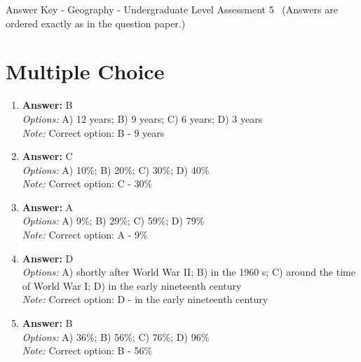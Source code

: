 \documentclass[12pt]{article}
\begin{document}
\begin{center}
Answer Key - Geography - Undergraduate Level Assessment 5 \
\small (Answers are ordered exactly as in the question paper.)
\end{center}

\section*{Multiple Choice}
\begin{enumerate}[label=\arabic*.]
\item \textbf{Answer:} B
\\ \textit{Options:} A) 12 years; B) 9 years; C) 6 years; D) 3 years
\\ \textit{Note:} Correct option: B - 9 years
\item \textbf{Answer:} C
\\ \textit{Options:} A) 10\%; B) 20\%; C) 30\%; D) 40\%
\\ \textit{Note:} Correct option: C - 30\%
\item \textbf{Answer:} A
\\ \textit{Options:} A) 9\%; B) 29\%; C) 59\%; D) 79\%
\\ \textit{Note:} Correct option: A - 9\%
\item \textbf{Answer:} D
\\ \textit{Options:} A) shortly after World War II; B) in the 1960 s; C) around the time of World War I; D) in the early nineteenth century
\\ \textit{Note:} Correct option: D - in the early nineteenth century
\item \textbf{Answer:} B
\\ \textit{Options:} A) 36\%; B) 56\%; C) 76\%; D) 96\%
\\ \textit{Note:} Correct option: B - 56\%
\end{enumerate}
\end{document}
